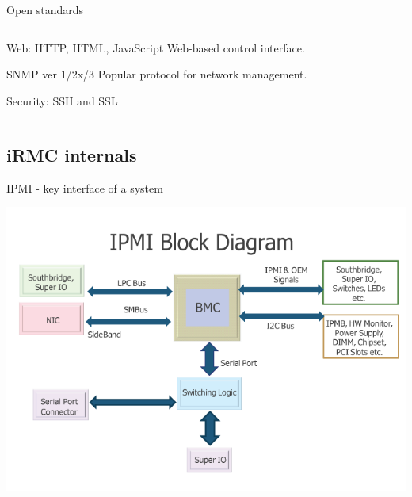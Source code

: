 \documentclass{beamer}
\begin{document}
\begin{frame}{Open standards}
\begin{columns}[onlytextwidth]
\begin{column}{0.7\textwidth}
			\begin{block}{Web: HTTP, HTML, JavaScript}
				Web-based control interface.
			\end{block}
			\pause

			\begin{block}{SNMP ver 1/2x/3}
				Popular protocol for network management.
			\end{block}
			\pause

			\begin{block}{Security: SSH and SSL}
			\end{block}
			\end{column}

		\end{columns}
	\end{frame}
  
   \subsection{iRMC internals}
   \begin{frame}{IPMI  - key interface of a system}
   	   \begin{center}
		   \includegraphics[scale=0.35]{ipmi-block-diagram.png}
   	   \end{center}
   \end{frame}
\end{document}
